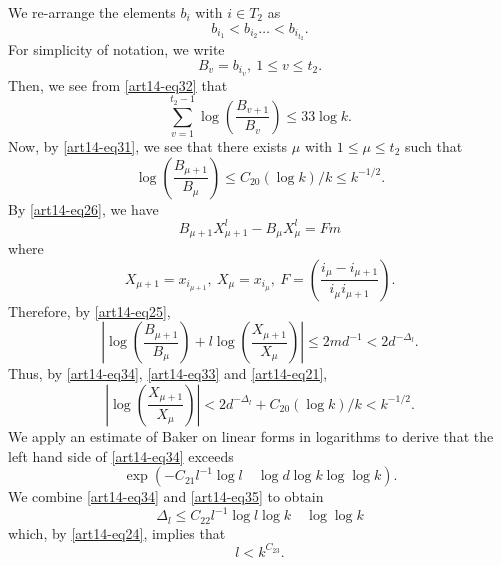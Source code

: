 We re-arrange the elements $b_{i}$ with $i\in T_{2}$ as
$$
b_{i_{1}}<b_{i_{2}}\ldots < b_{i_{t_{2}}}.
$$
For simplicity of notation, we write
$$
B_{v}=b_{i_{v}}, \ 1\leq v\leq t_{2}.
$$
Then, we see from \eqref{art14-eq32} that
$$
\sum\limits^{t_{2}-1}_{v=1}\log \left(\frac{B_{v+1}}{B_{v}}\right)\leq 33\log k.
$$
Now, by \eqref{art14-eq31}, we see that there exists $\mu$ with $1\leq \mu\leq t_{2}$ such that
\begin{equation}
\log \left(\frac{B_{\mu+1}}{B_{\mu}}\right)\leq C_{20}(\log k)/k\leq k^{-1/2}.\label{art14-eq33}
\end{equation}
By \eqref{art14-eq26}, we have
$$
B_{\mu+1}X^{l}_{\mu+1}-B_{\mu}X^{l}_{\mu}=Fm
$$
where
$$
X_{\mu+1}=x_{i_{\mu+1}}, \ X_{\mu}=x_{i_{\mu}}, \ F=\left(\frac{i_{\mu}-i_{\mu+1}}{i_{\mu}i_{\mu+1}}\right).
$$
Therefore, by \eqref{art14-eq25},
\begin{equation}
\left| \log \left(\frac{B_{\mu+1}}{B_{\mu}}\right)+l\log\left(\frac{X_{\mu+1}}{X_{\mu}}\right)\right|\leq 2md^{-1}<2d^{-\Delta_{l}}.\label{art14-eq34}
\end{equation}
Thus, by \eqref{art14-eq34}, \eqref{art14-eq33} and \eqref{art14-eq21},
$$
\left|\log \left(\frac{X_{\mu+1}}{X_{\mu}}\right)\right|<2d^{-\Delta_{l}}+C_{20}(\log k)/k<k^{-1/2}.
$$
We apply an estimate of Baker \cite{art14-key3} on linear forms in logarithms to derive that the left hand side of \eqref{art14-eq34} exceeds
\begin{equation}
\exp (-C_{21}l^{-1}\log l\quad \log d\log k\log \log k).\label{art14-eq35}
\end{equation}\pageoriginale
We combine \eqref{art14-eq34} and \eqref{art14-eq35} to obtain
$$
\Delta_{l}\leq C_{22}l^{-1}\log l\log k\quad \log\log k
$$
which, by \eqref{art14-eq24}, implies that
\begin{equation}
l<k^{C_{23}}.\label{art14-eq36}
\end{equation}

